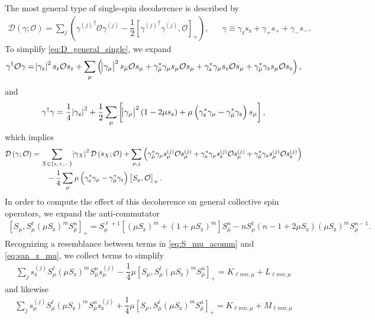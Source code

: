 \documentclass[pra,reprint,longbibliography]{revtex4-1}
\newcommand{\f}[2]{\dfrac{#1}{#2}} %
\newcommand{\p}[1]{\left(#1\right)} %
\renewcommand{\sp}[1]{\left[#1\right]} %
\renewcommand{\set}[1]{\left\{#1\right\}} %
\newcommand{\D}{\mathcal{D}}
\renewcommand{\O}{\mathcal{O}}
\newcommand{\z}{\text{z}}
\newcommand{\bmu}{{\bar\mu}}
\newcommand{\1}{\mathds{1}}
\begin{document}
The most general type of single-spin decoherence is described by
\begin{align}
  \D\p{\gamma;\O}
  = \sum_j\p{{\gamma^{(j)}}^\dag \O \gamma^{(j)}
    - \f12\sp{{\gamma^{(j)}}^\dag \gamma^{(j)}, \O}_+},
  &&
  \gamma \equiv \gamma_\z s_\z + \gamma_+ s_+ + \gamma_- s_-.
  \label{eq:D_general_single}
\end{align}
To simplify \eqref{eq:D_general_single}, we expand
\begin{align}
  \gamma^\dag \O \gamma
  = \abs{\gamma_\z}^2 s_\z \O s_\z
  + \sum_\mu \p{\abs{\gamma_\mu}^2 s_\bmu \O s_\mu
    + \gamma_\bmu^* \gamma_\mu s_\mu \O s_\mu
    + \gamma_\z^* \gamma_\mu s_\z \O s_\mu
    + \gamma_\bmu^* \gamma_\z s_\mu \O s_\z},
\end{align}
and
\begin{align}
  \gamma^\dag \gamma
  = \f14 \abs{\gamma_\z}^2
  + \f12 \sum_\mu \sp{\abs{\gamma_\mu}^2 \p{1-2\mu s_\z}
    + \mu \p{\gamma_\z^*\gamma_\mu - \gamma_\bmu^*\gamma_\z} s_\mu},
\end{align}
which implies
\begin{align}
  \D\p{\gamma;\O}
  &= \sum_{X\in\set{\z,+,-}} \abs{\gamma_X}^2 \D\p{s_X;\O}
  + \sum_{\mu,j}
  \p{\gamma_\bmu^* \gamma_\mu s_\mu^{(j)} \O s_\mu^{(j)}
    + \gamma_\z^* \gamma_\mu s_\z^{(j)} \O s_\mu^{(j)}
    + \gamma_\bmu^* \gamma_\z s_\mu^{(j)} \O s_\z^{(j)}}
  \notag \\
  &\qquad -\f14 \sum_\mu \mu
  \p{\gamma_\z^*\gamma_\mu - \gamma_\bmu^*\gamma_\z} \sp{S_\mu, \O}_+.
\end{align}
In order to compute the effect of this decoherence on general
collective spin operators, we expand the anti-commutator
\begin{align}
  \sp{S_\mu, S_\mu^\ell \p{\mu S_\z}^m S_\bmu^n}_+
  = S_\mu^{\ell+1} \sp{\p{\mu S_\z}^m+\p{1+\mu S_\z}^m} S_\bmu^n
  - n S_\mu^\ell \p{n-1+2\mu S_\z} \p{\mu S_\z}^m S_\bmu^{n-1}.
  \label{eq:S_mu_acomm}
\end{align}
Recognizing a resemblance between terms in \eqref{eq:S_mu_acomm} and
\eqref{eq:san_z_mu}, we collect terms to simplify
\begin{align}
  \sum_j s_\z^{(j)} S_\mu^\ell \p{\mu S_\z}^m S_\bmu^n s_\mu^{(j)}
  - \f14 \mu \sp{S_\mu, S_\mu^\ell \p{\mu S_\z}^m S_\bmu^n}_+
  = K_{\ell mn;\mu} + L_{\ell mn;\mu}
  \label{eq:dec_z_mu}
\end{align}
and likewise
\begin{align}
  \sum_j s_\mu^{(j)} S_\mu^\ell \p{\mu S_\z}^m S_\bmu^n s_\z^{(j)}
  + \f14 \mu \sp{S_\mu, S_\mu^\ell \p{\mu S_\z}^m S_\bmu^n}_+
  = K_{\ell mn;\mu} + M_{\ell mn;\mu}
  \label{eq:dec_mu_z}
\end{align}
\end{document}
